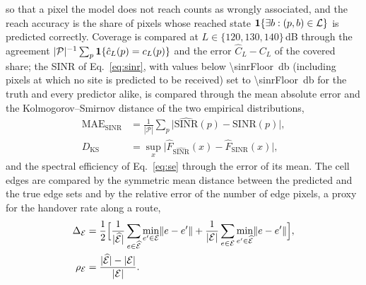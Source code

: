 so that a pixel the model does not reach counts as wrongly associated, and
the reach accuracy is the share of pixels whose reached state
$\mathbf{1}\{\exists b:(p,b)\in\mathcal{L}\}$ is predicted correctly. Coverage
is compared at $L\in\{120,130,140\}$\,dB through the agreement
$|\mathcal{P}|^{-1}\sum_p\mathbf{1}\{\hat c_L(p)=c_L(p)\}$ and the error
$\hat C_L-C_L$ of the covered share; the SINR of Eq.~\eqref{eq:sinr}, with
values below \SI{\sinrFloor}{\decibel} (including pixels at which no site is
predicted to be received) set to \SI{\sinrFloor}{\decibel} for the truth and
every predictor alike, is compared through the mean absolute error and the
Kolmogorov--Smirnov distance of the two empirical distributions,
\begin{equation}
\begin{aligned}
\mathrm{MAE}_{\mathrm{SINR}}&=\frac{1}{|\mathcal{P}|}\sum_p\bigl|\widehat{\mathrm{SINR}}(p)-\mathrm{SINR}(p)\bigr|,\\
D_{\mathrm{KS}}&=\sup_x\bigl|\hat F_{\widehat{\mathrm{SINR}}}(x)-\hat F_{\mathrm{SINR}}(x)\bigr|,
\end{aligned}
\label{eq:sinrmetrics}
\end{equation}
and the spectral efficiency of Eq.~\eqref{eq:se} through the error of its
mean. The cell edges are compared by the symmetric mean distance between
the predicted and the true edge sets and by the relative error of the
number of edge pixels, a proxy for the handover rate along a route,
\begin{equation}
\begin{aligned}
\Delta_{\mathcal{E}}&=\frac12\Bigl[\frac{1}{|\widehat{\mathcal{E}}|}\sum_{e\in\widehat{\mathcal{E}}}\min_{e'\in\mathcal{E}}\lVert e-e'\rVert
+\frac{1}{|\mathcal{E}|}\sum_{e\in\mathcal{E}}\min_{e'\in\widehat{\mathcal{E}}}\lVert e-e'\rVert\Bigr],\\
\rho_{\mathcal{E}}&=\frac{|\widehat{\mathcal{E}}|-|\mathcal{E}|}{|\mathcal{E}|}.
\end{aligned}
\label{eq:edges}
\end{equation}

